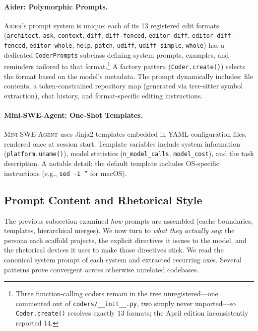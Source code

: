 \documentclass[11pt,a4paper]{article}
\newcommand{\adr}{\textsc{Aider}\xspace}
\newcommand{\mswe}{\textsc{Mini-SWE-Agent}\xspace}
\begin{document}
\paragraph{Aider: Polymorphic Prompts.}
\adr{}'s prompt system is unique: each of its 13 registered edit formats (\texttt{architect}, \texttt{ask}, \texttt{context}, \texttt{diff}, \texttt{diff-fenced}, \texttt{editor-diff}, \texttt{editor-diff-fenced}, \texttt{editor-whole}, \texttt{help}, \texttt{patch}, \texttt{udiff}, \texttt{udiff-simple}, \texttt{whole}) has a dedicated \texttt{CoderPrompts} subclass defining system prompts, examples, and reminders tailored to that format.\footnote{Three function-calling coders remain in the tree unregistered---one commented out of \texttt{coders/\_\_init\_\_.py}, two simply never imported---so \texttt{Coder.create()} resolves exactly 13 formats; the April edition inconsistently reported 14.}
A factory pattern (\texttt{Coder.create()}) selects the format based on the model's metadata.
The prompt dynamically includes: file contents, a token-constrained repository map (generated via tree-sitter symbol extraction), chat history, and format-specific editing instructions.

\paragraph{Mini-SWE-Agent: One-Shot Templates.}
\mswe{} uses Jinja2 templates embedded in YAML configuration files, rendered once at session start.
Template variables include system information (\texttt{platform.uname()}), model statistics (\texttt{n\_model\_calls}, \texttt{model\_cost}), and the task description.
A notable detail: the default template includes OS-specific instructions (e.g., \texttt{sed -i ''} for macOS).

\subsection{Prompt Content and Rhetorical Style}
\label{sec:prompt-content}

The previous subsection examined \emph{how} prompts are assembled (cache boundaries, templates, hierarchical merges).
We now turn to \emph{what they actually say}: the persona each scaffold projects, the explicit directives it issues to the model, and the rhetorical devices it uses to make those directives stick.
We read the canonical system prompt of each system and extracted recurring axes.
Several patterns prove convergent across otherwise unrelated codebases.
\end{document}
